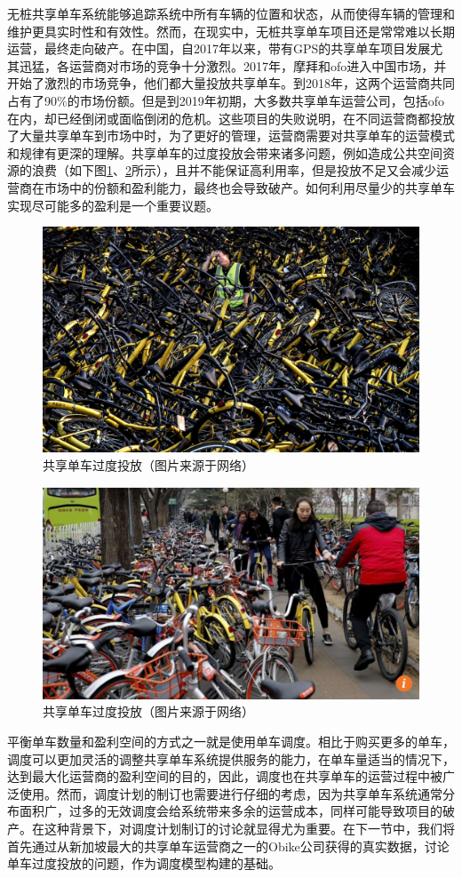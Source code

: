 \documentclass[]{tongjithesis}
\numberwithin{equation}{chapter}
\begin{document}
无桩共享单车系统能够追踪系统中所有车辆的位置和状态，从而使得车辆的管理和维护更具实时性和有效性。然而，在现实中，无桩共享单车项目还是常常难以长期运营，最终走向破产。在中国，自2017年以来，带有GPS的共享单车项目发展尤其迅猛，各运营商对市场的竞争十分激烈。2017年，摩拜和ofo进入中国市场，并开始了激烈的市场竞争，他们都大量投放共享单车。到2018年，这两个运营商共同占有了90\%的市场份额。但是到2019年初期，大多数共享单车运营公司，包括ofo在内，却已经倒闭或面临倒闭的危机。这些项目的失败说明，在不同运营商都投放了大量共享单车到市场中时，为了更好的管理，运营商需要对共享单车的运营模式和规律有更深的理解。共享单车的过度投放会带来诸多问题，例如造成公共空间资源的浪费（如下图\ref{waste1}、\ref{waste2}所示），且并不能保证高利用率，但是投放不足又会减少运营商在市场中的份额和盈利能力，最终也会导致破产。如何利用尽量少的共享单车实现尽可能多的盈利是一个重要议题。
\begin{figure}[H]
	\centering
	\includegraphics[width= 0.7 \textwidth]{figures_main/waste.jpg}
	\caption{共享单车过度投放（图片来源于网络）}
	\label{waste1}
\end{figure}

\begin{figure}[H]
	\centering
	\includegraphics[width= 0.7 \textwidth]{figures_main/waste1.jpg}
	\caption{共享单车过度投放（图片来源于网络）}
	\label{waste2}
\end{figure}

平衡单车数量和盈利空间的方式之一就是使用单车调度。相比于购买更多的单车，调度可以更加灵活的调整共享单车系统提供服务的能力，在单车量适当的情况下，达到最大化运营商的盈利空间的目的，因此，调度也在共享单车的运营过程中被广泛使用。然而，调度计划的制订也需要进行仔细的考虑，因为共享单车系统通常分布面积广，过多的无效调度会给系统带来多余的运营成本，同样可能导致项目的破产。在这种背景下，对调度计划制订的讨论就显得尤为重要。在下一节中，我们将首先通过从新加坡最大的共享单车运营商之一的Obike公司获得的真实数据，讨论单车过度投放的问题，作为调度模型构建的基础。
\end{document}
